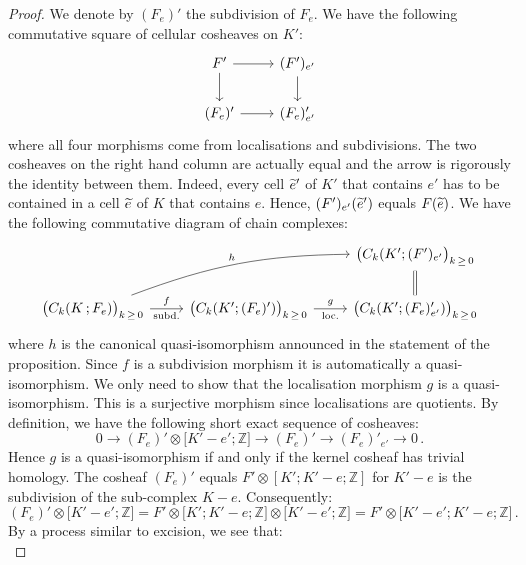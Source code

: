 \documentclass[AHL,Unicode,longabstracts,published]{cedram}
\newcommand{\Z}{\mathbb{Z}}
\let\oldtilde\tilde
\renewcommand*{\tilde}[1]{\mathchoice{\widetilde{#1}}{\widetilde{#1}}{\oldtilde{#1}}{\oldtilde{#1}}}
\begin{document}
\begin{proof}
We denote by $(F_e)'$ the subdivision of $F_e$. We have the following commutative square of cellular cosheaves on $K'$:
\begin{equation*}
\begin{tikzcd}
F' \ar[r] \ar[d] & (F')_{e'} \ar[d] \\%
(F_e)' \ar[r] & (F_e)'_{e'}
\end{tikzcd}
\end{equation*}
where all four morphisms come from localisations and subdivisions. The two cosheaves on the right hand column are actually equal and the arrow is rigorously the identity between them. Indeed, every cell $\tilde{e}'$ of $K'$ that contains $e'$ has to be contained in a cell $\tilde{e}$ of $K$ that contains $e$. Hence, $(F')_{e'}(\tilde{e}')$ equals $F(\tilde{e})$. We have the following commutative diagram of chain complexes:
\begin{equation*}
\begin{tikzcd}
& & \big(C_k(K' ;(F')_{e'}\big)_{k\,\geq\,0} \arrow[d,equal] \\%
\big(C_k(K\,;F_e)\big)_{k\,\geq\,0}\arrow[r,"\text{subd.}" below,"f" above] \ar[rru,"h",bend left=10] & \big(C_k(K';(F_e)')\big)_{k\,\geq\,0} \ar[r,"\text{loc.}" below,"g" above] & \big(C_k(K';(F_e)'_{e'})\big)_{k\,\geq\,0}
\end{tikzcd}
\end{equation*}
where $h$ is the canonical quasi-isomorphism announced in the statement of the proposition. Since $f$ is a subdivision morphism it is automatically a quasi-isomorphism. We only need to show that the localisation morphism $g$ is a quasi-isomorphism. This is a surjective morphism since localisations are quotients. By definition, we have the following short exact sequence of cosheaves:
\begin{equation*}
0\rightarrow (F_e)'\otimes \big[K'-e';\Z\big] \rightarrow (F_e)' \rightarrow (F_e)'_{e'} \rightarrow 0\,.
\end{equation*}
Hence $g$ is a quasi-isomorphism if and only if the kernel cosheaf has trivial homology. The cosheaf $(F_e)'$ equals $F'\otimes[K';K'-e;\Z]$ for $K'-e$ is the subdivision of the sub-complex $K-e$. Consequently:
\begin{equation*}
(F_e)'\otimes \big[K'-e';\Z\big]=F'\otimes\big[K';K'-e;\Z\big]\otimes \big[K'-e';\Z\big]=F'\otimes\big[K'-e';K'-e;\Z\big]\,.
\end{equation*}
By a process similar to excision, we see that:
\begin{equation*}

\end{equation*}
\end{proof}
\end{document}
